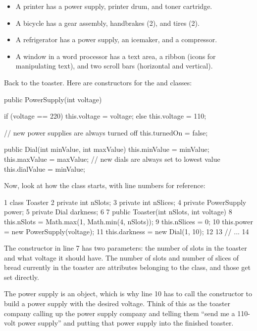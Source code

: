 \begin{itemize}
\item A printer has a power supply, printer drum, and toner cartridge.
\item A bicycle has a gear assembly, handbrakes (2), and tires (2).
\item A refrigerator has a power supply, an icemaker, and a compressor.
\item A window in a word processor has a text area, a ribbon (icons for manipulating text), and two scroll bars (horizontal and vertical).
\end{itemize}

Back to the toaster. Here are constructors for the  and  classes:

\begin{code}
public PowerSupply(int voltage) {
    if (voltage == 220) {
        this.voltage = voltage;
    } else {
        this.voltage = 110;
    }

    // new power supplies are always turned off
    this.turnedOn = false;
}

public Dial(int minValue, int maxValue) {
    this.minValue = minValue;
    this.maxValue = maxValue;
    // new dials are always set to lowest value
    this.dialValue = minValue;
}
\end{code}

Now, look at how the  class starts, with line numbers for reference:

\begin{code}
 1 class Toaster {
 2     private int nSlots;
 3     private int nSlices;
 4     private PowerSupply power;
 5     private Dial darkness;
 6  
 7     public Toaster(int nSlots, int voltage) {
 8         this.nSlots = Math.max(1, Math.min(4, nSlots));
 9         this.nSlices = 0;
10         this.power = new PowerSupply(voltage);
11         this.darkness = new Dial(1, 10);
12     }
13     // ...
14 }
\end{code}

The constructor in line 7 has two parameters: the number of slots in the toaster and what voltage it should have. The number of slots and number of slices of bread currently in the toaster are attributes belonging to the  class, and those get set directly.

The power supply is an object, which is why line 10 has to call the  constructor to build a power supply with the desired voltage. Think of this as the toaster company calling up the power supply company and telling them “send me a 110-volt power supply” and putting that power supply into the finished toaster.

